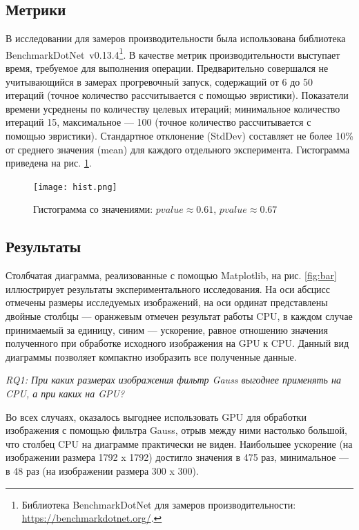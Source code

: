 \subsection{Метрики}

В исследовании для замеров производительности была использована библиотека Bench\-mark\-Dot\-Net~v0.13.4\footnote{Библиотека BenchmarkDotNet для замеров производительности: \url{https://benchmarkdotnet.org/}.}. В качестве метрик производительности выступает время, требуемое для выполнения операции. Предварительно совершался не учитывающийся в замерах прогревочный запуск, содержащий от 6 до 50 итераций (точное количество рассчитывается с помощью эвристики). Показатели времени усреднены по количеству целевых итераций; минимальное количество итераций 15, максимальное --- 100 (точное количество рассчитывается с помощью эвристики). Стандартное отклонение (StdDev) составляет не более 10\% от среднего значения (mean) для каждого отдельного эксперимента. Гистограмма приведена на рис. \ref{fig:hist}.

\begin{figure}
    \centering
    \texttt{[image: hist.png]}
    \caption{Гистограмма со значениями: $pvalue \approx 0.61$, $pvalue \approx 0.67$}
    \label{fig:hist}
\end{figure}

\subsection{Результаты}

Столбчатая диаграмма, реализованные с помощью Mat\-plot\-lib, на рис. \ref{fig:bar} иллюстрирует результаты экспериментального исследования. На оси абсцисс отмечены размеры исследуемых изображений, на оси ординат представлены двойные столбцы --- оранжевым отмечен результат работы CPU, в каждом случае принимаемый за единицу, синим --- ускорение, равное отношению значения полученного при обработке исходного изображения на GPU к CPU. Данный вид диаграммы позволяет компактно изобразить все полученные данные.

\textit{RQ1: При каких размерах изображения фильтр Gauss выгоднее применять на CPU, а при каких на GPU?}

Во всех случаях, оказалось выгоднее использовать GPU для обработки изображения с помощью фильтра Gauss, отрыв между ними настолько большой, что столбец CPU на диаграмме практически не виден. Наибольшее ускорение (на изображении размера 1792 x 1792) достигло значения в 475 раз, минимальное --- в 48 раз (на изображении размера 300 x 300).

